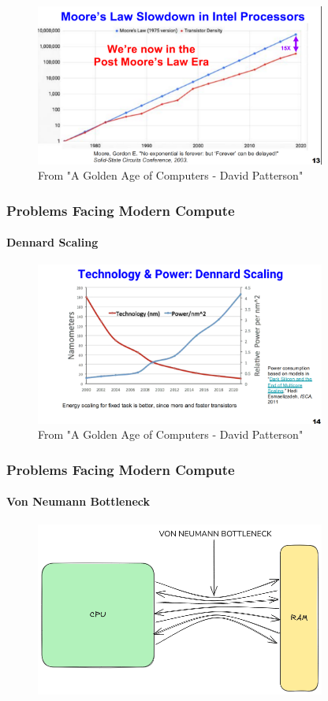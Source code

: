 \documentclass{beamer}
\begin{document}
{\begin{frame}[fragile]
  \begin{figure}
    \centering
    \includegraphics[width=0.85\textwidth]{mooreslaw.png}
    \caption{From "A Golden Age of Computers - David Patterson"
    \cite{patterson19}}
  \end{figure}

\end{frame}

\begin{frame}[fragile]
\frametitle{Problems Facing Modern Compute}
  \framesubtitle{Dennard Scaling}

  \begin{figure}
    \centering
    \includegraphics[width=0.85\textwidth]{dennardscaling.png}
    \caption{From "A Golden Age of Computers - David Patterson"}
  \end{figure}
\end{frame}

\begin{frame}[fragile]
\frametitle{Problems Facing Modern Compute}
  \framesubtitle{Von Neumann Bottleneck}

  \begin{figure}
    \centering
    \includegraphics[width=0.85\textwidth]{vonneumann.png}
  \end{figure}
\end{frame}

}
\end{document}
